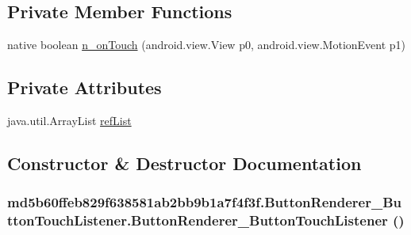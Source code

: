 \subsection*{Private Member Functions}
\begin{CompactItemize}
\item 
native boolean \hyperlink{classmd5b60ffeb829f638581ab2bb9b1a7f4f3f_1_1_button_renderer___button_touch_listener_8cfa93947f06e817f218196291038bc1}{n\_\-onTouch} (android.view.View p0, android.view.MotionEvent p1)
\end{CompactItemize}
\subsection*{Private Attributes}
\begin{CompactItemize}
\item 
java.util.ArrayList \hyperlink{classmd5b60ffeb829f638581ab2bb9b1a7f4f3f_1_1_button_renderer___button_touch_listener_84ecbd0189aa8fa49c03393cf6f9be5a}{refList}
\end{CompactItemize}


\subsection{Constructor \& Destructor Documentation}
\hypertarget{classmd5b60ffeb829f638581ab2bb9b1a7f4f3f_1_1_button_renderer___button_touch_listener_192a213a65256d8407ba9184a509de91}{
\subsubsection[{ButtonRenderer\_\-ButtonTouchListener}]{\setlength{\rightskip}{0pt plus 5cm}md5b60ffeb829f638581ab2bb9b1a7f4f3f.ButtonRenderer\_\-ButtonTouchListener.ButtonRenderer\_\-ButtonTouchListener ()}}
\label{classmd5b60ffeb829f638581ab2bb9b1a7f4f3f_1_1_button_renderer___button_touch_listener_192a213a65256d8407ba9184a509de91}




